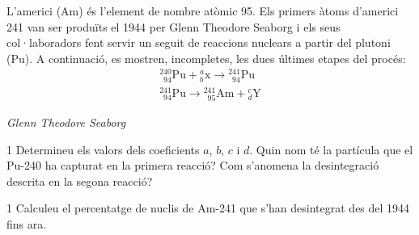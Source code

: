 \begin{minipage}[t]{0.66\linewidth}
L'americi (Am) és l'element de nombre atòmic 95. Els primers àtoms d'americi 241 van ser produïts el 1944 per Glenn Theodore Seaborg i els seus col·laboradors fent servir un seguit de reaccions nuclears a partir del plutoni (Pu). A continuació, es mostren, incompletes, les dues últimes etapes del procés:
\begin{gather*}
{}^{240}_{\phantom{2}94}\mathrm{Pu} + {}^{a}_{b}\mathrm{x} \rightarrow {}^{241}_{\phantom{2}94}\mathrm{Pu}\\
{}^{241}_{\phantom{2}94}\mathrm{Pu} \rightarrow {}^{241}_{\phantom{2}95}\mathrm{Am} + {}^{c}_{d}\mathrm{Y}
\end{gather*}
\end{minipage}\hfill
\begin{minipage}[t]{0.3\linewidth}
\vspace{0pt}
{\centering\textit{Glenn Theodore Seaborg}\par}
\end{minipage}

\begin{apartat}{1}
Determineu els valors dels coeficients $a$, $b$, $c$ i $d$. Quin nom té la partícula que el Pu-240 ha capturat en la primera reacció? Com s'anomena la desintegració descrita en la segona reacció?
\end{apartat}

\begin{apartat}{1}
Calculeu el percentatge de nuclis de Am-241 que s'han desintegrat des del 1944 fins ara.
\end{apartat}

